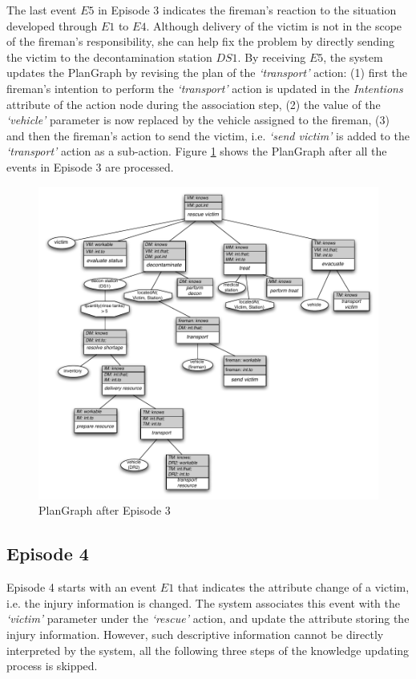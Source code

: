 The last event $E5$ in Episode 3 indicates the fireman's reaction to the situation developed through $E1$ to $E4$. Although delivery of the victim is not in the scope of the fireman's responsibility, she can help fix the problem by directly sending the victim to the decontamination station $DS1$. By receiving $E5$, the system updates the PlanGraph by revising the plan of the \emph{`transport'} action: (1) first the fireman's intention to perform the \emph{`transport'} action is updated in the \emph{Intentions} attribute of the action node during the association step, (2) the value of the \emph{`vehicle'} parameter is now replaced by the vehicle assigned to the fireman, (3) and then the fireman's action to send the victim, i.e. \emph{`send victim'} is added to the \emph{`transport'} action as a sub-action. Figure \ref{fig:plangraph_ep3} shows the PlanGraph after all the events in Episode 3 are processed.

\begin{figure}[htbp] %
	\centering
	\includegraphics[width=5.8in]{plangraph_ep3.pdf} 
	\caption{PlanGraph after Episode 3}
	\label{fig:plangraph_ep3}
\end{figure}

\subsection{Episode 4} %
\label{sub:episode_4}
Episode 4 starts with an event $E1$ that indicates the attribute change of a victim, i.e. the injury information is changed. The system associates this event with the \emph{`victim'} parameter under the \emph{`rescue'} action, and update the attribute storing the injury information. However, such descriptive information cannot be directly interpreted by the system, all the following three steps of the knowledge updating process is skipped. 

